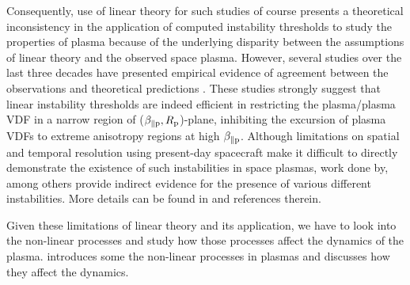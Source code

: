         Consequently, use of linear theory for such studies of course presents a theoretical
        inconsistency in the application of computed instability thresholds to study the properties
        of plasma because of the underlying disparity between the assumptions of linear theory and
        the observed space plasma. However, several studies over the last three decades have
        presented empirical evidence of agreement between the observations and theoretical
        predictions \citep{Gary1991, Gary1994, Gary2001, Gary2006, Kasper2002, Hellinger2006,
        Maruca2011, Maruca2012, Maruca2018}. These studies strongly suggest that linear instability
        thresholds are indeed efficient in restricting the plasma/plasma VDF in a narrow region of
        ($\beta_{\parallel \rm p}, R_{\rm p}$)-plane, inhibiting the excursion of plasma VDFs to
        extreme anisotropy regions at high $\beta_{\parallel \rm p}$. Although limitations on
        spatial and temporal resolution using present-day spacecraft make it difficult to directly
        demonstrate the existence of such instabilities in space plasmas, work done by,
        \citet{Bale2009, He2011, Podesta2013, Jian2009, Jian2010, Jian2014, Klein2014, Telloni2016,
        Gary2016} among others provide indirect evidence for the presence of various different
        instabilities. More details can be found in \citet{Verscharen2019} and references therein.

        Given these limitations of linear theory and its application, we have to look into the
        non-linear processes and study how those processes affect the dynamics of the plasma.
         introduces some the non-linear processes in plasmas and discusses how they
        affect the dynamics.